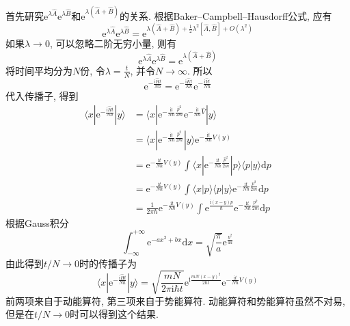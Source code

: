         首先研究$\mathrm{e}^{\lambda \hat{A}}\mathrm{e}^{\lambda \hat{B}}$和$\mathrm{e}^{\lambda (\hat{A}+\hat{B})}$的关系. 根据Baker–Campbell–Hausdorff公式, 应有
        \begin{equation}
            \mathrm{e}^{\lambda \hat{A}} \mathrm{e}^{\lambda \hat{B}} = \mathrm{e}^{\lambda (\hat{A}+\hat{B}) + \frac 12 \lambda^2 [\hat{A},\hat{B}] + O(\lambda^2)}
        \end{equation}
        如果$\lambda \to 0$, 可以忽略二阶无穷小量, 则有
        \begin{equation}
            \mathrm{e}^{\lambda \hat{A}} \mathrm{e}^{\lambda \hat{B}} = \mathrm{e}^{\lambda (\hat{A}+\hat{B})}
        \end{equation}
        将时间平均分为$N$份, 令$\lambda = \frac tN$, 并令$N \to \infty$. 所以
        \begin{equation}
            \mathrm{e}^{-\frac {\mathrm{i}\hat{H}t}{N\hbar}} = \mathrm{e}^{-\frac {\mathrm{i}\hat{K}t}{N\hbar}} \mathrm{e}^{-\frac {\mathrm{i}\hat{V}t}{N\hbar}}
        \end{equation}
        代入传播子, 得到
        \begin{equation}\begin{aligned}
            \langle x | \mathrm{e}^{-\frac {\mathrm{i}\hat{H}t}{N\hbar}} | y \rangle &= \langle x | \mathrm{e}^{-\frac {\mathrm{i}t}{N\hbar}\frac {\hat{p}^2}{2m}} 
            \mathrm{e}^{-\frac {\mathrm{i}t}{N\hbar}\hat{V}} |y \rangle\\
            &= \langle x | \mathrm{e}^{- \frac{\mathrm{i}t}{N\hbar} \frac{\hat{p}^2}{2m}} |y \rangle \mathrm{e}^{-\frac {\mathrm{i}t}{N\hbar}V(y)} \\
            &= \mathrm{e}^{-\frac {\mathrm{i}t}{N\hbar}V(y)} \int \langle x | \mathrm{e}^{-\frac {\mathrm{i}t}{N\hbar}\frac {\hat{p}^2}{2m}} |p \rangle \langle p |y \rangle \mathrm{d}p \\
            &= \mathrm{e}^{-\frac {\mathrm{i}t}{N\hbar}V(y)} \int \langle x|p \rangle \langle p|y \rangle \mathrm{e}^{-\frac {\mathrm{i}t}{N\hbar}\frac {p^2}{2m}} \mathrm{d}p\\
            &= \frac 1{2\pi \hbar} \mathrm{e}^{-\frac {\mathrm{i}t}{N\hbar}V(y)} \int \mathrm{e}^{\frac {\mathrm{i}(x-y)p}{\hbar}} \mathrm{e}^{-\frac {\mathrm{i}t}{N\hbar}\frac {p^2}{2m}} \mathrm{d} p
        \end{aligned}\end{equation}
        根据Gauss积分
        \begin{equation}
            \int_{-\infty}^{+\infty} \mathrm{e}^{-ax^2+bx} \mathrm{d}x = \sqrt{\frac {\pi}a} \mathrm{e}^{\frac {b^2}{4a}}
        \end{equation}
        由此得到$t/N \to 0$时的传播子为
        \begin{equation}
            \langle x | \mathrm{e}^{-\frac {\mathrm{i}\hat{H}t}{N\hbar}} | y \rangle = \sqrt{\frac {mN}{2\pi\mathrm{i} \hbar t}} \mathrm{e}^{\mathrm{i}\frac {mN(x-y)^2}{2\hbar t}}\mathrm{e}^{-\frac {\mathrm{i}t}{N\hbar} V(y)}
        \end{equation}
        前两项来自于动能算符, 第三项来自于势能算符. 动能算符和势能算符虽然不对易, 但是在$t/N \to 0$时可以得到这个结果. 

